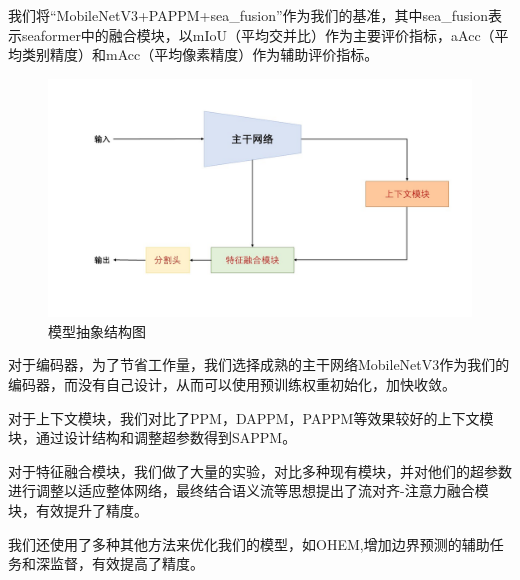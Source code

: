 \documentclass[11pt]{article}
\begin{document}
我们将“MobileNetV3+PAPPM+sea_fusion”作为我们的基准，其中sea_fusion表示seaformer中的融合模块，以mIoU（平均交并比）作为主要评价指标，aAcc（平均类别精度）和mAcc（平均像素精度）作为辅助评价指标。
\begin{figure}[H]
  \centering
  \includegraphics[width=12cm]{ar.jpg}

  \centering
  \caption{模型抽象结构图}
  \label{fig:5}
\end{figure}
对于编码器，为了节省工作量，我们选择成熟的主干网络MobileNetV3作为我们的编码器，而没有自己设计，从而可以使用预训练权重初始化，加快收敛。

对于上下文模块，我们对比了PPM，DAPPM，PAPPM等效果较好的上下文模块，通过设计结构和调整超参数得到SAPPM。

对于特征融合模块，我们做了大量的实验，对比多种现有模块，并对他们的超参数进行调整以适应整体网络，最终结合语义流等思想提出了流对齐-注意力融合模块，有效提升了精度。

我们还使用了多种其他方法来优化我们的模型，如OHEM,增加边界预测的辅助任务和深监督，有效提高了精度。
\end{document}
